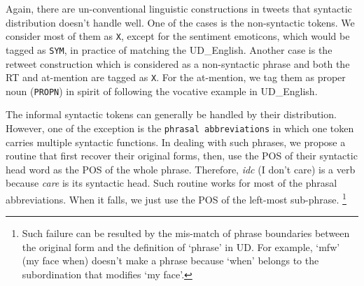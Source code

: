 \documentclass[11pt,letterpaper]{article}
\newcommand{\heart}{\ensuremath\heartsuit}
\begin{document}
Again, there are un-conventional linguistic constructions in tweets that syntactic distribution doesn't handle well.
One of the cases is the non-syntactic tokens.
We consider most of them as {\tt X}, except for the sentiment emoticons, which would be tagged as {\tt SYM}, in practice of matching the UD\_English.
Another case is the retweet construction which is considered as a non-syntactic phrase and both the RT and at-mention are tagged as {\tt X}.
For the at-mention, we tag them as proper noun ({\tt PROPN}) in spirit of following the vocative example in UD\_English.


The informal syntactic tokens can generally be handled by their distribution.
However, one of the exception is the {\tt phrasal abbreviations} in which one token carries multiple syntactic functions.
In dealing with such phrases, we propose a routine that first recover their original forms, then, use the POS of their syntactic head word as the POS of the whole phrase.
Therefore, {\it idc} (I don't care) is a verb because {\it care} is its syntactic head.
Such routine works for most of the phrasal abbreviations.
When it falls, we just use the POS of the left-most sub-phrase. \footnote{Such failure can be resulted by the mis-match of phrase boundaries between the original form and the definition of `phrase' in UD. For example, `mfw' (my face when) doesn't make a phrase because `when' belongs to the subordination that modifies `my face'.}

\end{document}
